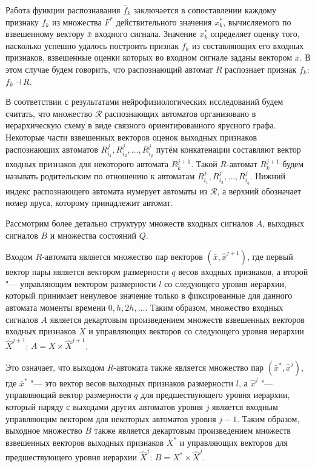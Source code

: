\documentclass[a4paper, 12pt]{article}
\theoremstyle{plain}
\begin{document}
	Работа функции распознавания $\hat f_k$ заключается в сопоставлении каждому признаку $f_k$ из множества $F^*$ действительного значения $x_k^*$, вычисляемого по взвешенному вектору $\bar x$ входного сигнала. Значение $x_k^*$ определяет оценку того, насколько успешно удалось построить признак $f_k$ из составляющих его входных признаков, взвешенные оценки которых во входном сигнале заданы вектором $\bar x$. В этом случае будем говорить, что распознающий автомат $R$ распознает признак $f_k$: $f_k\dashv R$.
	
	В соответствии с результатами нейрофизиологических исследований \cite{Felleman1991} будем считать, что множество  $\mathcal R$ распознающих автоматов организовано в иерархическую схему в виде связного ориентированного ярусного графа. Некоторые части взвешенных векторов оценок выходных признаков распознающих автоматов $R_{i_1}^j,R_{i_2}^j,\dots,R_{i_q}^j$ путём конкатенации составляют вектор входных признаков для некоторого автомата $R_k^{j+1}$. Такой $R$-автомат $R_k^{j+1}$ будем называть родительским по отношению к автоматам $R_{i_1}^j,R_{i_2}^j,\dots,R_{i_q}^j$. Нижний индекс распознающего автомата нумерует автоматы из $\mathcal R$, а верхний обозначает номер яруса, которому принадлежит автомат.
		
	Рассмотрим более детально структуру множеств входных сигналов $A$, выходных сигналов $B$ и множества состояний $Q$.
	
	Входом $R$-автомата является множество пар векторов $(\bar x,\hat x^{j+1})$, где первый вектор пары является вектором размерности $q$ весов входных признаков, а второй "--- управляющим вектором размерности $l$ со следующего уровня иерархии, который принимает ненулевое значение только в фиксированные для данного автомата моменты времени $0,h,2h,\dots$. Таким образом, множество входных сигналов $A$ является декартовым произведением множеств взвешенных векторов входных признаков $X$ и управляющих векторов со следующего уровня иерархии $\hat X^{j+1}$: $A=X\times \hat X^{j+1}$. 
	
	Это означает, что выходом $R$-автомата также является множество пар $(\bar x^*,\hat x^j)$, где $\bar x^*$ "--- это вектор весов выходных признаков размерности $l$, а $\hat x^j$ "--- управляющий вектор размерности $q$ для предшествующего уровня иерархии, который наряду с выходами других автоматов уровня $j$ является входным управляющим вектором для некоторых автоматов уровня $j-1$. Таким образом, выходное множество $B$ также является декартовым произведением множеств взвешенных векторов выходных признаков $X^*$ и управляющих векторов для предшествующего уровня иерархии $\hat X^j$: $B=X^*\times \hat X^j$.
	
\end{document}

